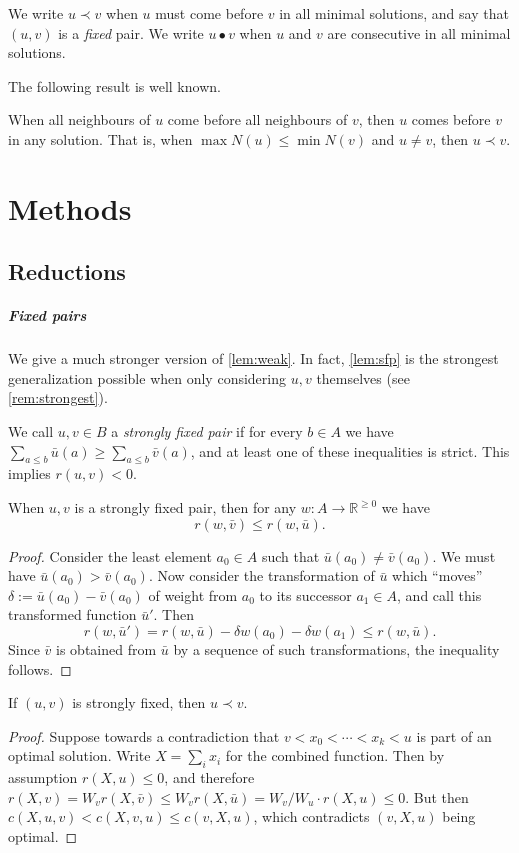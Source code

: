 \documentclass[a4paper,UKenglish,cleveref, autoref, thm-restate]{lipics-v2021}
\renewcommand{\b}{\prec}
\newcommand{\g}{\bullet}
\begin{document}
We write $u\b v$ when $u$ must come before $v$ in all minimal solutions, and say that $(u, v)$
is a \emph{fixed} pair.
We write $u\g v$ when $u$ and $v$ are consecutive in all minimal solutions.

The following result is well known.

\begin{observation}\label{lem:weak}
  When all neighbours of $u$ come before all neighbours of $v$, then $u$ comes
  before $v$ in any solution.
  That is, when $\max N(u) \leq \min N(v)$ and $u\neq v$, then $u\b v$.
\end{observation}

\section{Methods}
\subsection{Reductions}
\subparagraph{Fixed pairs}
We give a much stronger version of \cref{lem:weak}. In fact, \cref{lem:sfp} is the strongest
generalization possible when only considering $u, v$ themselves (see \cref{rem:strongest}).
\begin{definition}
    We call $u, v \in B$ a \emph{strongly fixed pair} if for every $b \in A$ we have ${\sum_{a
    \leq b} \bar u(a) \geq \sum_{a \leq b} \bar v(a)}$, and at least one of these inequalities
    is strict. This implies $r(u, v) < 0$.
\end{definition}
\begin{lemma}\label{lem:sfp} When $u, v$ is a strongly fixed pair,
    then for any $w: A\to \mathbb R^{\geq 0}$ we have 
    \[
        r(w, \bar v) \leq r(w, \bar u).
    \]
\end{lemma}
\begin{proof}
    Consider the least element $a_0 \in A$ such that $\bar u(a_0) \neq
    \bar v(a_0)$. We must have $\bar u(a_0) > \bar v(a_0)$. Now consider the transformation of
    $\bar u$ which ``moves'' $\delta := \bar u(a_0) - \bar v(a_0)$ of weight from $a_0$ to its
    successor $a_1 \in A$, and call this transformed function $\bar u'$. Then
    \[
        r(w, \bar u') = r(w, \bar u) - \delta w(a_0) - \delta w(a_1) \leq r(w, \bar u).
    \]
    Since $\bar v$ is obtained from $\bar u$ by a sequence of such transformations,
    the inequality follows.
\end{proof}
\begin{lemma}
    If $(u, v)$ is strongly fixed, then $u \b v$.
\end{lemma}
\begin{proof}
    Suppose towards a contradiction that $v < x_0 < \cdots < x_k < u$ is part of an optimal
    solution. Write $X = \sum_i x_i$ for the combined function. Then by assumption $r(X, u)
    \leq 0$, and therefore $r(X, v) = W_v r(X, \bar v) \leq W_v r(X, \bar u) = W_v / W_u \cdot
    r(X, u) \leq 0$. But then $c(X, u, v) < c(X, v, u)\leq c(v, X, u)$, which
    contradicts $(v,X,u)$ being optimal.
\end{proof}
\end{document}
